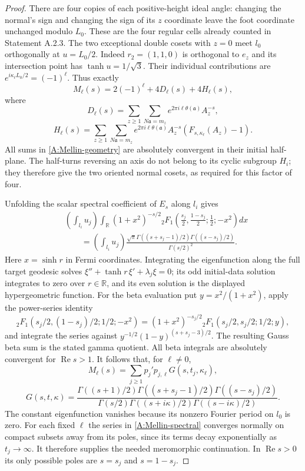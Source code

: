 \begin{proof}
There are four copies of each positive-height ideal angle: changing
the normal's sign and changing the sign of its $z$ coordinate leave
the foot coordinate unchanged modulo $L_0$. These are the four
regular cells already counted in Statement A.2.3. The two exceptional
double cosets with $z=0$ meet $l_0$ orthogonally at $u=L_0/2$.
Indeed $r_2=(1,1,0)$ is orthogonal to $e_z$ and its intersection
point has $\tanh u=1/\sqrt3$. Their individual contributions are
$e^{i\kappa_\ell L_0/2}=(-1)^\ell$. Thus exactly
\begin{equation}\label{A:Mellin-geometry}
 M_\ell(s)=2(-1)^\ell+4D_\ell(s)+4H_\ell(s),
\end{equation}
where
\[
 D_\ell(s)=\sum_{z\geq1}\sum_{N\mathfrak a=m_z}
          e^{2\pi i\ell\theta(\mathfrak a)}A_z^{-s},
\]
\[
 H_\ell(s)=\sum_{z\geq1}\sum_{N\mathfrak a=m_z}
 e^{2\pi i\ell\theta(\mathfrak a)}A_z^{-s}
                    (F_{s,\kappa_\ell}(A_z)-1).
\]
All sums in \eqref{A:Mellin-geometry} are absolutely convergent
in their initial half-plane. The half-turns reversing an axis do not
belong to its cyclic subgroup $H_i$; they therefore give the two
oriented normal cosets, as required for this factor of four.

Unfolding the scalar spectral coefficient of $E_s$ along $l_i$ gives
\[
 \begin{aligned}
 &\left(\int_{l_i}u_j\right)
 \int_{\mathbb R}(1+x^2)^{-s/2}
 {}_2F_1\left(\frac{s_j}{2},\frac{1-s_j}{2};\frac12;-x^2\right)dx
 \\
 &\qquad=\left(\int_{l_i}u_j\right)
 \frac{\sqrt\pi\Gamma((s+s_j-1)/2)\Gamma((s-s_j)/2)}{\Gamma(s/2)^2}.
 \end{aligned}
\]
Here $x=\sinh r$ in Fermi coordinates. Integrating the eigenfunction
along the full target geodesic solves
$\xi''+\tanh r\,\xi'+\lambda_j\xi=0$; its odd initial-data solution
integrates to zero over $r\in\mathbb R$, and its even solution is
the displayed hypergeometric function. For the beta evaluation put
$y=x^2/(1+x^2)$, apply the power-series identity
\[
 {}_2F_1(s_j/2,(1-s_j)/2;1/2;-x^2)
 =(1+x^2)^{-s_j/2}{}_2F_1(s_j/2,s_j/2;1/2;y),
\]
and integrate the series against
$y^{-1/2}(1-y)^{(s+s_j-3)/2}$. The resulting Gauss beta sum
is the stated gamma quotient. All beta integrals are absolutely
convergent for $\operatorname{Re}s>1$.
It follows that, for $\ell\ne0$,
\begin{equation}\label{A:Mellin-spectral}
 M_\ell(s)=\sum_{j\geq1}p_j'p_{j,\ell}G(s,t_j,\kappa_\ell),
\end{equation}
\[
 G(s,t,\kappa)=
 \frac{\Gamma((s+1)/2)\Gamma((s+s_j-1)/2)\Gamma((s-s_j)/2)}
 {\Gamma(s/2)\Gamma((s+i\kappa)/2)\Gamma((s-i\kappa)/2)}.
\]
The constant eigenfunction vanishes because its nonzero Fourier
period on $l_0$ is zero. For each fixed $\ell$ the series in
\eqref{A:Mellin-spectral} converges normally on compact subsets away
from its poles, since its terms decay exponentially as
$t_j\to\infty$. It therefore supplies the needed meromorphic
continuation. In $\operatorname{Re}s>0$ its only possible poles are
$s=s_j$ and $s=1-s_j$.


\end{proof}
